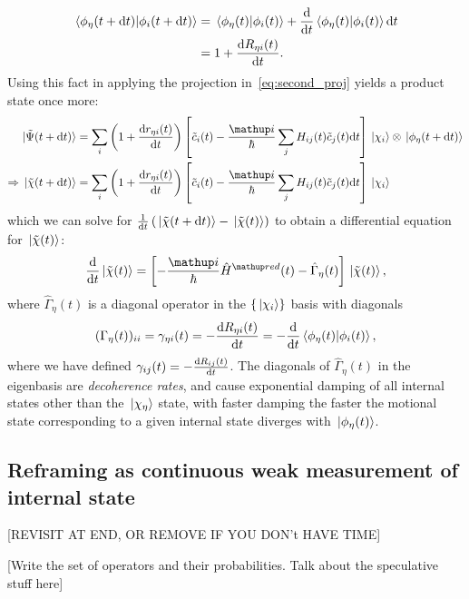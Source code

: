 \begin{align}
\braket{\phi_\eta(t + \dd t)}{\phi_i(t + \dd t)} &= \braket{\phi_\eta(t)}{\phi_i(t)} + \dv{t}\braket{\phi_\eta(t)}{\phi_i(t)}\dd t\\
& = 1 + \dv{R_{\eta i}(t)}{t}.
\end{align}
Using this fact in applying the projection in~\eqref{eq:second_proj} yields a product state once more:
\begin{align}
\ket{\tilde \Psi(t + \dd t)} &= 
\sum_i
\left(1 + \dv{r_{\eta i}(t)}{t}\right)
\left[\tilde c_i(t) - \frac{\ii}\hbar\sum_j H_{ij}(t) \tilde c_j(t)\dd t\right]
\ket{\chi_i}\otimes\ket{\phi_\eta(t + \dd t)}\\
\Rightarrow \ket{\tilde \chi(t + \dd t)} &= \sum_i
\left(1 + \dv{r_{\eta i}(t)}{t}\right)
\left[\tilde c_i(t) - \frac{\ii}\hbar\sum_j H_{ij}(t) \tilde c_j(t)\dd t\right]
\ket{\chi_i}
\end{align}
which we can solve for $\frac1{\dd t}\left(\ket{\tilde \chi(t + \dd t)} - \ket{\tilde \chi(t)}\right)$ to obtain a differential equation for $\ket{\tilde \chi(t)}$:
\begin{align}
\dv{t} \ket{\tilde \chi(t)} =
\left[-\frac\ii\hbar\hat H^\up{red}(t) - \hat\Gamma_\eta(t)\right]\ket{\tilde\chi(t)},
\end{align}
where $\hat\Gamma_\eta(t)$ is a diagonal operator in the $\{\ket{\chi_i}\}$ basis with diagonals
\begin{align}
(\Gamma_\eta(t))_{ii} = \gamma_{\eta i}(t) = -\dv{R_{\eta i}(t)}{t} = -\dv{t} \braket{\phi_\eta(t)}{\phi_i(t)},
\end{align}
where we have defined $\gamma_{ij}(t) = -\dv{R_{ij}(t)}{t}$. The diagonals of $\hat \Gamma_\eta(t)$ in the eigenbasis are \emph{decoherence rates}, and cause exponential damping of all internal states other than the $\ket{\chi_\eta}$ state, with faster damping the faster the motional state corresponding to a given internal state diverges with $\ket{\phi_\eta(t)}$.

\subsection{Reframing as continuous weak measurement of internal state}

[REVISIT AT END, OR REMOVE IF YOU DON't HAVE TIME]

[Write the set of operators and their probabilities. Talk about the speculative stuff here]

